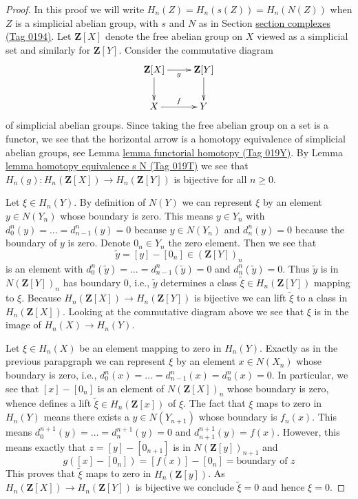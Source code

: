 \documentclass{amsart}
\theoremstyle{plain}
\theoremstyle{definition}
\theoremstyle{remark}
\numberwithin{equation}{subsection}
\begin{document}
\begin{proof}
In this proof we will write $H_n(Z) = H_n(s(Z)) = H_n(N(Z))$
when $Z$ is a simplicial abelian group, with $s$ and $N$ as in
Section \href{https://stacks.math.columbia.edu/tag/0194}{section complexes (Tag 0194)}.
Let $\mathbf{Z}[X]$ denote the free abelian group on $X$ viewed as
a simplicial set and similarly for $\mathbf{Z}[Y]$. Consider the
commutative diagram
$$
\xymatrix{
\mathbf{Z}[X] \ar[r]_g \ar[d] &
\mathbf{Z}[Y] \ar[d] \\
X \ar[r]^f & Y
}
$$
of simplicial abelian groups. Since taking the free abelian group on a set
is a functor, we see that the horizontal arrow is a homotopy equivalence of
simplicial abelian groups, see Lemma \href{https://stacks.math.columbia.edu/tag/019Y}{lemma functorial homotopy (Tag 019Y)}.
By Lemma \href{https://stacks.math.columbia.edu/tag/019T}{lemma homotopy equivalence s N (Tag 019T)}
we see that $H_n(g) : H_n(\mathbf{Z}[X]) \to H_n(\mathbf{Z}[Y])$ is bijective
for all $n \geq 0$.

\medskip\noindent
Let $\xi \in H_n(Y)$. By definition of $N(Y)$ we can represent
$\xi$ by an element $y \in N(Y_n)$ whose boundary is zero.
This means $y \in Y_n$ with $d^n_0(y) = \ldots = d^n_{n - 1}(y) = 0$
because $y \in N(Y_n)$ and $d^n_n(y) = 0$ because the boundary
of $y$ is zero. Denote $0_n \in Y_n$ the zero element. Then we see that
$$
\tilde y = [y] - [0_n] \in (\mathbf{Z}[Y])_n
$$
is an element with $d^n_0(\tilde y) = \ldots = d^n_{n - 1}(\tilde y) = 0$
and $d^n_n(\tilde y) = 0$. Thus $\tilde y$ is in $N(\mathbf{Z}[Y])_n$
has boundary $0$, i.e., $\tilde y$ determines a
class $\tilde \xi \in H_n(\mathbf{Z}[Y])$ mapping to $\xi$.
Because $H_n(\mathbf{Z}[X]) \to H_n(\mathbf{Z}[Y])$ is bijective
we can lift $\tilde \xi$ to a class in $H_n(\mathbf{Z}[X])$.
Looking at the commutative diagram above
we see that $\xi$ is in the image of $H_n(X) \to H_n(Y)$.

\medskip\noindent
Let $\xi \in H_n(X)$ be an element mapping to zero in $H_n(Y)$.
Exactly as in the previous parapgraph we can represent
$\xi$ by an element $x \in N(X_n)$ whose boundary is zero, i.e.,
$d^n_0(x) = \ldots = d^n_{n - 1}(x) = d^n_n(x) = 0$.
In particular, we see that $[x] - [0_n]$ is an element of
$N(\mathbf{Z}[X])_n$ whose boundary is zero, whence defines
a lift $\tilde \xi \in H_n(\mathbf{Z}[x])$ of $\xi$.
The fact that $\xi$ maps to zero in $H_n(Y)$
means there exists a $y \in N(Y_{n + 1})$ whose boundary is $f_n(x)$.
This means $d^{n + 1}_0(y) = \ldots = d^{n + 1}_n(y) = 0$ and
$d^{n + 1}_{n + 1}(y) = f(x)$.
However, this means exactly that
$z = [y] - [0_{n + 1}]$ is in $N(\mathbf{Z}[y])_{n + 1}$ and
$$
g([x] - [0_n]) = [f(x)] - [0_n] = \text{boundary of }z
$$
This proves that $\tilde \xi$ maps to zero in $H_n(\mathbf{Z}[y])$.
As $H_n(\mathbf{Z}[X]) \to H_n(\mathbf{Z}[Y])$ is bijective
we conclude $\tilde \xi = 0$ and hence $\xi = 0$.
\end{proof}
\end{document}
